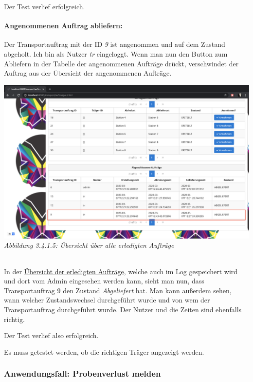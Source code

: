 \documentclass[enabledeprecatedfontcommands,fontsize=12pt,paper=a4,twoside]{scrartcl}
\begin{document}
Der Test verlief erfolgreich. 

\paragraph{Angenommenen Auftrag abliefern:}

Der Transportauftrag mit der ID \textit{9} ist angenommen und auf dem Zustand abgeholt. Ich bin als Nutzer \textit{tr} eingeloggt. Wenn man nun den Button zum Abliefern in der Tabelle der angenommenen Aufträge drückt, verschwindet der Auftrag aus der Übersicht der angenommenen Aufträge. 

\hypertarget{sc3.4.1.5}{
\includegraphics[width=1\textwidth]{Screenshots/3415.png}
\textit{Abbildung 3.4.1.5: Übersicht über alle erledigten Aufträge}
} \\

In der \hyperlink{sc3.4.1.5}{Übersicht der erledigten Aufträge}, welche auch im Log gespeichert wird und dort vom Admin eingesehen werden kann, sieht man nun, dass Transportauftrag 9 den Zustand \textit{Abgeliefert} hat. Man kann außerdem sehen, wann welcher Zustandswechsel durchgeführt wurde und von wem der Transportauftrag durchgeführt wurde. Der Nutzer und die Zeiten sind ebenfalls richtig. 

Der Test verlief also erfolgreich. 

{
\color{red} Es muss getestet werden, ob die richtigen Träger angezeigt werden.
}
 


\hypertarget{3.4.2}{\subsubsection{Anwendungsfall: Probenverlust melden}}
\end{document}
